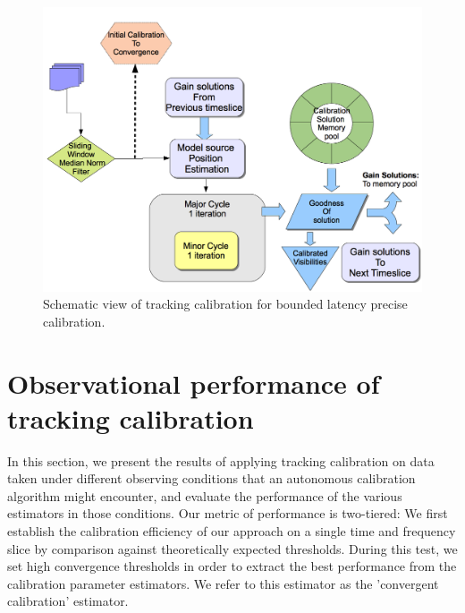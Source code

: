 \documentclass{aa}
\begin{document}
\begin{figure}[tbh]
\includegraphics[width=1\columnwidth]{Figs/tracking_cal_schematic}

\caption{\label{fig:trackcalSchematic}Schematic view of tracking calibration
for bounded latency precise calibration.}
\end{figure}

\section{\label{sec:Performance-of-tracking}Observational performance of tracking calibration}


In this section, we present the results of applying tracking calibration on data
taken  under  different  observing  conditions that  an  autonomous  calibration
algorithm  might  encounter,  and   evaluate  the  performance  of  the  various
estimators in  those conditions.   Our metric of  performance is  two-tiered: We
first establish the calibration efficiency of  our approach on a single time and
frequency slice by comparison  against theoretically expected thresholds. During
this  test, we  set high  convergence thresholds  in order  to extract  the best
performance  from  the  calibration  parameter  estimators.  We  refer  to  this
estimator as the 'convergent calibration' estimator.
\end{document}
